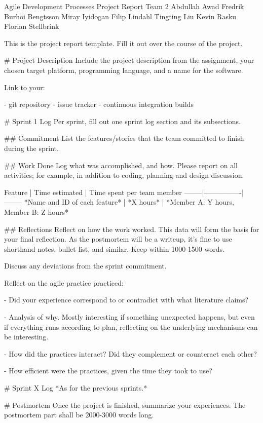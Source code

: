 \documentclass[14]{article}
\begin{document}
\iffalse
Agile Development Processes Project Report
Team 2
Abdullah Awad
Fredrik Burhöi Bengtsson
Miray Iyidogan
Filip Lindahl
Tingting Liu
Kevin Rasku
Florian Stellbrink

This is the project report template.
Fill it out over the course of the project.

# Project Description
Include the project description from the assignment,
your chosen target platform,
programming language,
and a name for the software.

Link to your:

- git repository
- issue tracker
- continuous integration builds

# Sprint 1 Log
Per sprint, fill out one sprint log section and its subsections.

## Commitment
List the features/stories that the team committed to finish during the sprint.

## Work Done
Log what was accomplished, and how.
Please report on all activities; for example, in addition to coding, planning and design discussion.

Feature | Time estimated | Time spent per team member
--------|----------------|--------
*Name and ID of each feature* | *X hours* | *Member A: Y hours, Member B: Z hours*

## Reflections
Reflect on how the work worked.
This data will form the basis for your final reflection.
As the postmortem will be a writeup, it's fine to use shorthand notes, bullet list, and similar.
Keep within 1000-1500 words.

Discuss any deviations from the sprint commitment.

Reflect on the agile practice practiced:

- Did your experience correspond to or contradict with what literature claims?

    - Analysis of why. Mostly interesting if something unexpected happens, but even
      if everything runs according to plan, reflecting on the underlying mechanisms
      can be interesting.

- How did the practices interact?
  Did they complement or counteract each other?

- How efficient were the practices, given the time they took to use?


# Sprint X Log
*As for the previous sprints.*


# Postmortem
Once the project is finished, summarize your experiences.
The postmortem part shall be 2000-3000 words long.
\end{document}
